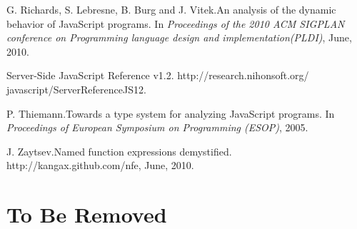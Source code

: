\documentclass[10pt, preprint]{sigplanconf}
\begin{document}
\begin{thebibliography}{}
G. Richards, S. Lebresne, B. Burg and J. Vitek.\newblock An analysis of the dynamic behavior of JavaScript programs.
\newblock In \emph{Proceedings of the 2010 ACM SIGPLAN conference on Programming language design and implementation(PLDI)},
June, 2010.

Server-Side JavaScript Reference v1.2.
\newblock http://research.nihonsoft.org/ javascript/ServerReferenceJS12.

P. Thiemann.\newblock Towards a type system for analyzing JavaScript programs.
\newblock In \emph{Proceedings of European Symposium on Programming (ESOP)},
2005.

J. Zaytsev.\newblock Named function expressions demystified.
\newblock http://kangax.github.com/nfe,
June, 2010.


\end{thebibliography}


\section{To Be Removed}
\end{document}

